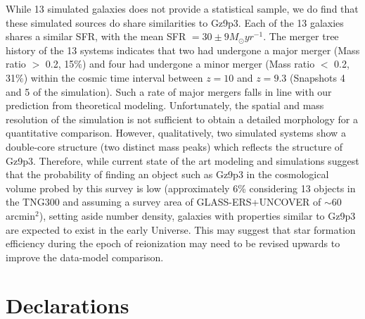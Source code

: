 \documentclass[sn-mathphys]{sn-jnl}%
\theoremstyle{thmstyleone}%
\theoremstyle{thmstyletwo}%
\theoremstyle{thmstylethree}%
\begin{document}
While 13 simulated galaxies does not provide a statistical sample, we do find that these simulated sources do share similarities to Gz9p3. Each of the 13 galaxies shares a similar SFR, with the mean SFR $= 30\pm9 M_\odot yr^{-1}$. 
The merger tree history of the 13 systems indicates that two had undergone a major merger (Mass ratio $>$ 0.2, 15$\%$) and four had undergone a minor merger (Mass ratio $<$ 0.2, 31$\%$) within the cosmic time interval between $z=10$ and $z=9.3$ (Snapshots 4 and 5 of the simulation). Such a rate of major mergers falls in line with our prediction from theoretical modeling. Unfortunately, the spatial and mass resolution of the simulation is not sufficient to obtain a detailed morphology for a quantitative comparison. However, qualitatively, two simulated systems show a double-core structure (two distinct mass peaks) which reflects the structure of Gz9p3. Therefore, while current state of the art modeling and simulations suggest that the probability of finding an object such as Gz9p3 in the cosmological volume probed by this survey is low (approximately 6\% considering 13 objects in the TNG300 and assuming a survey area of GLASS-ERS+UNCOVER of $\sim 60$ arcmin$^2$), setting aside number density, galaxies with properties similar to Gz9p3 are expected to exist in the early Universe. This may suggest that star formation efficiency during the epoch of reionization may need to be revised upwards to improve the data-model comparison. 


\section*{Declarations}
\end{document}
